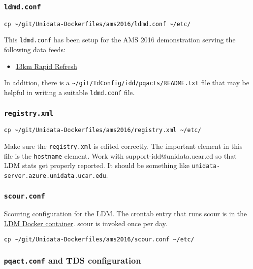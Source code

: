 \documentclass[11pt]{article}
\begin{document}
\subsubsection*{\texttt{ldmd.conf}}
\label{sec:orgheadline4}

\begin{verbatim}
cp ~/git/Unidata-Dockerfiles/ams2016/ldmd.conf ~/etc/
\end{verbatim}

This \texttt{ldmd.conf} has been setup for the AMS 2016 demonstration serving the following data feeds:
\begin{itemize}
\item \href{http://rapidrefresh.noaa.gov/}{13km Rapid Refresh}
\end{itemize}

In addition, there is a \texttt{\textasciitilde{}/git/TdConfig/idd/pqacts/README.txt} file that may be helpful in writing a suitable \texttt{ldmd.conf} file.

\subsubsection*{\texttt{registry.xml}}
\label{sec:orgheadline5}

\begin{verbatim}
cp ~/git/Unidata-Dockerfiles/ams2016/registry.xml ~/etc/
\end{verbatim}

Make sure the \texttt{registry.xml} is edited correctly. The important element in this file is the \texttt{hostname} element. Work with support-idd@unidata.ucar.ed so that LDM stats get properly reported. It should be something like \texttt{unidata-server.azure.unidata.ucar.edu}.

\subsubsection*{\texttt{scour.conf}}
\label{sec:orgheadline6}

Scouring configuration for the LDM. The crontab entry that runs scour is in the \href{https://github.com/Unidata/Unidata-Dockerfiles/blob/master/ldm/crontab}{LDM Docker container}. scour is invoked once per day.

\begin{verbatim}
cp ~/git/Unidata-Dockerfiles/ams2016/scour.conf ~/etc/
\end{verbatim}

\subsubsection*{\texttt{pqact.conf} and TDS configuration}
\label{sec:orgheadline7}
\end{document}
